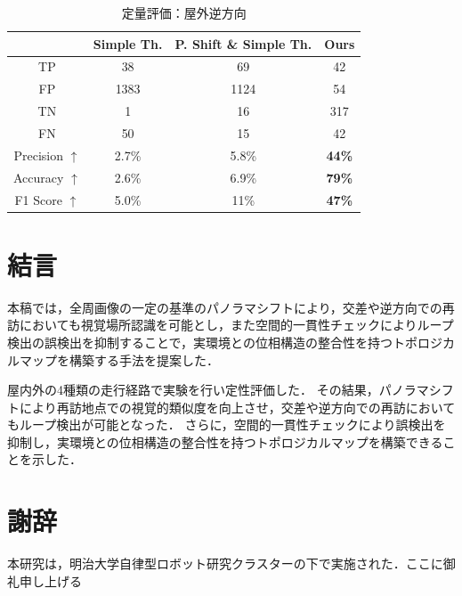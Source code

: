 \documentclass[conference]{IEEEtran}
\begin{document}
\begin{table}[t]
  \centering
  \small
  \caption{定量評価：屋外逆方向}
  \label{table:ld_eval_outdoor_reverse}%
  \begin{tabular}{cccc}
  \toprule%
  & \textbf{Simple Th.} & \textbf{P. Shift \& Simple Th.} & \textbf{Ours}\\
  \midrule%
  TP & 38 & 69 & 42\\
  FP & 1383 & 1124 & 54\\
  TN & 1 & 16 & 317\\
  FN & 50 & 15 & 42\\
  Precision \textbf{$\uparrow$} & 2.7\% & 5.8\% & \textbf{44\%}\\
  Accuracy \textbf{$\uparrow$} & 2.6\% & 6.9\% & \textbf{79\%}\\
  F1 Score \textbf{$\uparrow$} & 5.0\% & 11\% & \textbf{47\%}\\
  \bottomrule%
  \end{tabular}
\end{table}

\section{結言}

本稿では，全周画像の一定の基準のパノラマシフトにより，交差や逆方向での再訪においても視覚場所認識を可能とし，また空間的一貫性チェックによりループ検出の誤検出を抑制することで，実環境との位相構造の整合性を持つトポロジカルマップを構築する手法を提案した．

屋内外の4種類の走行経路で実験を行い定性評価した．
その結果，パノラマシフトにより再訪地点での視覚的類似度を向上させ，交差や逆方向での再訪においてもループ検出が可能となった．
さらに，空間的一貫性チェックにより誤検出を抑制し，実環境との位相構造の整合性を持つトポロジカルマップを構築できることを示した．

\section*{謝辞}
本研究は，明治大学自律型ロボット研究クラスターの下で実施された．ここに御礼申し上げる
\end{document}
